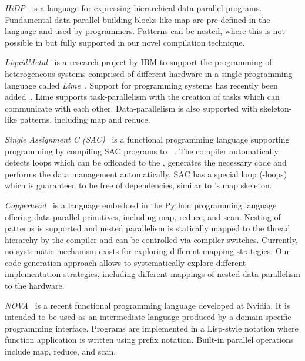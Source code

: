 \bigskip

\emph{{\small HiDP}}~\cite{ZhangM13} is a language for expressing hierarchical data-parallel programs.
Fundamental data-parallel building blocks like map are pre-defined in the language and used by programmers.
Patterns can be nested, where this is not possible in \SkelCL but fully supported in our novel compilation technique.

\bigskip

\emph{LiquidMetal}~\cite{HuangHBR08} is a research project by IBM to support the programming of heterogeneous systems comprised of different hardware in a single programming language called \emph{Lime}~\cite{AuerbachBCR10}.
Support for programming \GPU systems has recently been added~\cite{DubachCRBF12}.
Lime supports task-parallelism with the creation of tasks which can communicate with each other.
Data-parallelism is also supported with skeleton-like patterns, including map and reduce.

\bigskip

\emph{Single Assignment C (SAC)}~\cite{GrelckS06} is a functional programming language supporting \GPUs programming by compiling SAC programs to \CUDA~\cite{GuoTS11}.
The compiler automatically detects loops which can be offloaded to the \GPU, generates the necessary \CUDA code and performs the data management automatically.
SAC has a special loop (-loops) which is guaranteed to be free of dependencies, similar to \SkelCL's map skeleton.

\bigskip

\emph{Copperhead}~\cite{CatanzaroGK11} is a \GPU language embedded in the Python programming language offering data-parallel primitives, including map, reduce, and scan.
Nesting of patterns is supported and nested parallelism is statically mapped to the \GPU thread hierarchy by the compiler and can be controlled via compiler switches.
Currently, no systematic mechanism exists for exploring different mapping strategies.
Our code generation approach allows to systematically explore different implementation strategies, including different mappings of nested data parallelism to the hardware.

\bigskip

\emph{{\small NOVA}}~\cite{CollinsGGLS14} is a recent functional \GPU programming language developed at Nvidia.
It is intended to be used as an intermediate language produced by a domain specific programming interface.
Programs are implemented in a Lisp-style notation where function application is written using prefix notation.
Built-in parallel operations include map, reduce, and scan.

